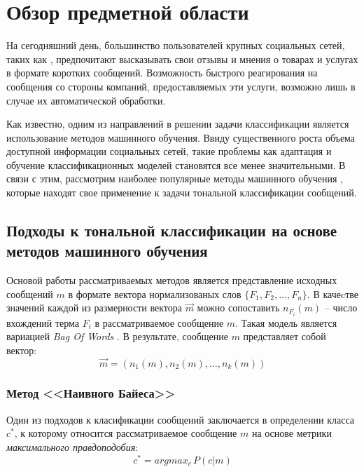 \section{Обзор предметной области}
    На сегодняшний день, большинство пользователей крупных социальных сетей,
    таких как \twitter, предпочитают высказывать свои отзывы и мнения о товарах
    и услугах в формате коротких сообщений. Возможность быстрого реагирования
    на сообщения со стороны компаний, предоставляемых эти услуги, возможно лишь
    в случае их автоматической обработки.

    Как известно, одним из направлений в решении задачи классификации является
    использование методов машинного обучения. Ввиду существенного роста объема
    доступной информации социальных сетей, такие проблемы как адаптация и
    обучение классификационных моделей становятся все менее значительными.
    В связи с этим, рассмотрим наиболее популярные методы машинного обучения \cite{svmAdvantages},
    которые находят свое применение к задачи тональной классификации сообщений.

    \subsection{Подходы к тональной классификации на основе методов машинного обучения}
        \label{sec:mlApproaches}
        Основой работы рассматриваемых методов является представление исходных
        сообщений $m$ в формате вектора нормализованых слов $\{F_1, F_2, \ldots, F_n\}$.
        В качеcтве значений каждой из размерности вектора $\vec{m}$ можно сопоставить
        $n_{F_i}(m)$ -- число вхождений терма $F_i$ в рассматриваемое сообщение $m$.
        Такая модель является вариацией {\it Bag Of Words} \cite{svmAdvantages}.
        В результате, сообщение $m$ представляет собой вектор:
        \begin{equation}
            \vec{m} = (n_1(m), n_2(m), \ldots, n_k(m))
        \end{equation}

        \subsubsection{Метод <<Наивного Байеса>>}
        Один из подходов к класификации сообщений заключается в определении класса $c^{*}$,
        к которому относится рассматриваемое сообщение $m$ на основе метрики
        {\it максимального правдоподобия}:
        \begin{equation}
            c^{*} = argmax_c \hspace{2pt} P(c|m)
        \end{equation}

